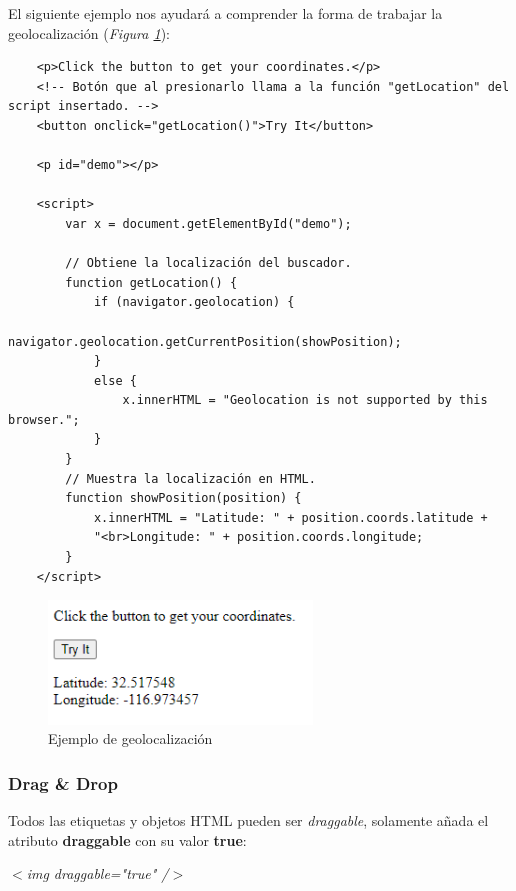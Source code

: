 El siguiente ejemplo nos ayudará a comprender la forma de trabajar la geolocalización (\textit{Figura \ref{fig: 19}}):
\begin{lstlisting}
    <p>Click the button to get your coordinates.</p>
    <!-- Botón que al presionarlo llama a la función "getLocation" del script insertado. -->
    <button onclick="getLocation()">Try It</button>
            
    <p id="demo"></p>

    <script>
        var x = document.getElementById("demo");

        // Obtiene la localización del buscador.
        function getLocation() {
            if (navigator.geolocation) {
                navigator.geolocation.getCurrentPosition(showPosition);
            }
            else { 
                x.innerHTML = "Geolocation is not supported by this browser.";
            }
        }
        // Muestra la localización en HTML.
        function showPosition(position) {
            x.innerHTML = "Latitude: " + position.coords.latitude + 
            "<br>Longitude: " + position.coords.longitude;
        }
    </script>
\end{lstlisting}
\begin{figure}[H]
    \centering
    \caption{Ejemplo de geolocalización}
    \label{fig: 19}
    \includegraphics[width=7cm]{ss_html/geolocation_1.png}
\end{figure}


\subsubsection{Drag \& Drop}
\hspace{0.55cm}Todos las etiquetas y objetos HTML pueden ser \textit{draggable}, solamente añada el atributo \textbf{draggable} con su valor \textbf{true}:
\begin{center}
    \textit{$<$img draggable="true" /$>$}
\end{center}

